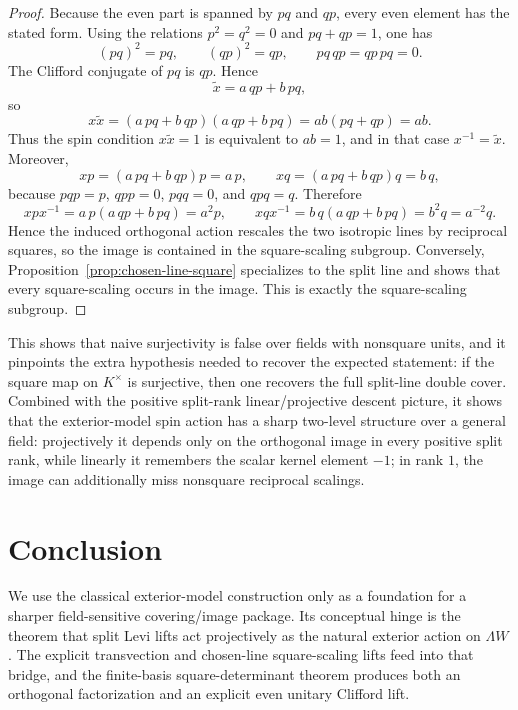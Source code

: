 \documentclass{birkjour}
\theoremstyle{plain}
\theoremstyle{definition}
\theoremstyle{remark}
\newcommand{\wedgeW}{\Lambda W}
\begin{document}
\begin{proof}
Because the even part is spanned by $pq$ and $qp$, every even element has the
stated form. Using the relations $p^2=q^2=0$ and $pq+qp=1$, one has
\[
  (pq)^2=pq,\qquad (qp)^2=qp,\qquad pq\,qp=qp\,pq=0.
\]
The Clifford conjugate of \(pq\) is \(qp\).
Hence
\[
  \tilde x = a\,qp+b\,pq,
\]
so
\[
  x\tilde x
  =(a\,pq+b\,qp)(a\,qp+b\,pq)
  =ab(pq+qp)
  =ab.
\]
Thus the spin condition $x\tilde x=1$ is equivalent to $ab=1$, and in that case
$x^{-1}=\tilde x$. Moreover,
\[
  xp=(a\,pq+b\,qp)p=a\,p,\qquad xq=(a\,pq+b\,qp)q=b\,q,
\]
because $pqp=p$, $qpp=0$, $pqq=0$, and $qpq=q$. Therefore
\[
  xpx^{-1}=a\,p(a\,qp+b\,pq)=a^2p,
  \qquad
  xqx^{-1}=b\,q(a\,qp+b\,pq)=b^2q=a^{-2}q.
\]
Hence the induced orthogonal action rescales the two isotropic lines by
reciprocal squares, so the image is contained in the square-scaling subgroup.
Conversely, Proposition~{}\ref{prop:chosen-line-square} specializes to the split
line and shows that every square-scaling occurs in the image. This is exactly
the square-scaling subgroup.
\end{proof}

This shows that naive surjectivity is false over fields with nonsquare units,
and it pinpoints the extra hypothesis needed to recover the expected statement:
if the square map on $K^\times$ is surjective, then one recovers the full
split-line double cover. Combined with the positive split-rank
linear/projective descent picture, it shows that the exterior-model spin action
has a sharp two-level structure over a general field: projectively it depends
only on the orthogonal image in every positive split rank, while linearly it
remembers the scalar kernel element $-1$; in rank $1$, the image can
additionally miss nonsquare reciprocal scalings.

\section{Conclusion}
\label{sec:conclusion}

We use the classical exterior-model construction only as a foundation
for a sharper field-sensitive covering/image package. Its conceptual hinge is
the theorem that split Levi lifts act projectively as the natural exterior
action on $\wedgeW$. The explicit transvection and chosen-line
square-scaling lifts feed into that bridge, and the finite-basis
square-determinant theorem produces both an orthogonal factorization and an
explicit even unitary Clifford lift.
\end{document}
